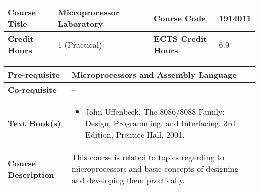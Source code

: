 \documentclass[12pt]{article}
\begin{document}
\begin{minipage}{\textwidth}
\begin{tabularx}{\textwidth}{|l|X|l|X|}
\hline
\textbf{Course Title}       &  Microprocessor Laboratory & \textbf{Course Code}       &  1914011 \\ \hline
\textbf{Credit Hours}       &  1 (Practical) & \textbf{ECTS Credit Hours}       &   6.9 \\ \hline
\end{tabularx}

\begin{tabularx}{\textwidth}{|l|X|}
\hline
\textbf{Pre-requisite}      &  Microprocessors and Assembly Language \\ \hline
\textbf{Co-requisite}       &  -- \\ \hline
\textbf{Text Book(s)}      & \begin{minipage}{.70\textwidth}
					\begin{itemize} \itemsep-0.4em
						\vspace{3mm}
						\item John Uffenbeck, The 8086/8088 Family: Design, Programming, and Interfacing. 3rd Edition, Prentice Hall, 2001.
						\vspace{3mm}
					\end{itemize}
				\end{minipage}  \\ \hline
\textbf{Course Description} & \begin{minipage}{.70\textwidth}
					\vspace{3mm}
					This course is related to topics regarding to microprocessors and basic concepts of
					designing and developing them practically.

					\vspace{3mm}
					\end{minipage} \\ \hline
\end{tabularx}
\end{minipage}


\bigskip
\bigskip
\end{document}
